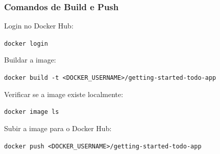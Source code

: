 \begin{frame}
  \frametitle{Comandos de Build e Push}
  Login no Docker Hub:

  \vspace{0.3em}
  \texttt{docker login}

  \vspace{0.5em}
  Buildar a image:

  \vspace{0.3em}
  \texttt{docker build -t <DOCKER\_USERNAME>/getting-started-todo-app}

  \vspace{0.5em}
  Verificar se a image existe localmente:

  \vspace{0.3em}
  \texttt{docker image ls}

  \vspace{0.5em}
  Subir a image para o Docker Hub:

  \vspace{0.3em}
  \texttt{docker push <DOCKER\_USERNAME>/getting-started-todo-app}
\end{frame}